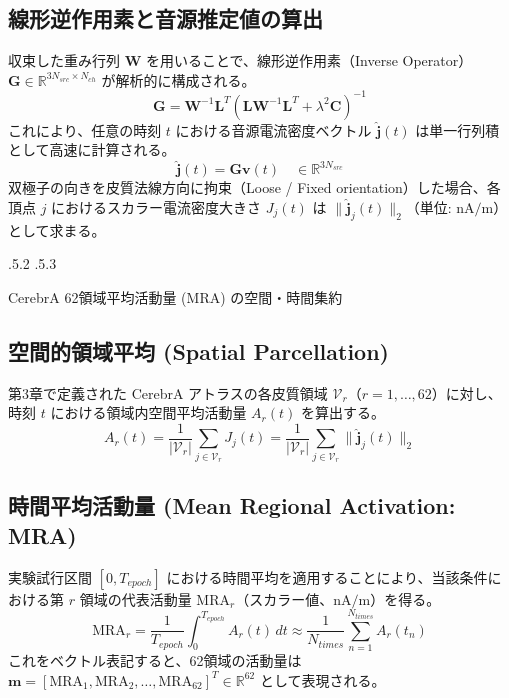 \documentclass[platex,dvipdfmx,12pt]{jsarticle}
\makeatletter
\renewcommand{\section}{%
  \clearpage
  \@startsection{section}{1}{\z@}%
  {\Cvs \@plus.5\Cdp \@minus.2\Cdp}%
  {.5\Cvs \@plus.3\Cdp}%
  {\normalfont\LARGE\headfont\raggedright}%
}
\makeatother
\begin{document}
\subsection{線形逆作用素と音源推定値の算出}
収束した重み行列 $\mathbf{W}$ を用いることで、線形逆作用素（Inverse Operator） $\mathbf{G} \in \mathbb{R}^{3 N_{src} \times N_{ch}}$ が解析的に構成される。
\begin{equation}
  \mathbf{G} = \mathbf{W}^{-1} \mathbf{L}^T \left( \mathbf{L} \mathbf{W}^{-1} \mathbf{L}^T + \lambda^2 \mathbf{C} \right)^{-1}
  \label{eq:inverse_operator}
\end{equation}
これにより、任意の時刻 $t$ における音源電流密度ベクトル $\hat{\mathbf{j}}(t)$ は単一行列積として高速に計算される。
\begin{equation}
  \hat{\mathbf{j}}(t) = \mathbf{G} \mathbf{v}(t) \quad \in \mathbb{R}^{3 N_{src}}
  \label{eq:source_reconstruction}
\end{equation}
双極子の向きを皮質法線方向に拘束（Loose / Fixed orientation）した場合、各頂点 $j$ におけるスカラー電流密度大きさ $J_j(t)$ は $\|\hat{\mathbf{j}}_j(t)\|_2$（単位: $\text{nA/m}$）として求まる。

\section{CerebrA 62領域平均活動量 (MRA) の空間・時間集約}

\subsection{空間的領域平均 (Spatial Parcellation)}
第3章で定義された CerebrA アトラスの各皮質領域 $\mathcal{V}_r$（$r=1, \dots, 62$）に対し、時刻 $t$ における領域内空間平均活動量 $A_r(t)$ を算出する。
\begin{equation}
  A_r(t) = \frac{1}{|\mathcal{V}_r|} \sum_{j \in \mathcal{V}_r} J_j(t) = \frac{1}{|\mathcal{V}_r|} \sum_{j \in \mathcal{V}_r} \|\hat{\mathbf{j}}_j(t)\|_2
  \label{eq:spatial_aggregation}
\end{equation}

\subsection{時間平均活動量 (Mean Regional Activation: MRA)}
実験試行区間 $[0, T_{epoch}]$ における時間平均を適用することにより、当該条件における第 $r$ 領域の代表活動量 $\text{MRA}_r$（スカラー値、$\text{nA/m}$）を得る。
\begin{equation}
  \text{MRA}_r = \frac{1}{T_{epoch}} \int_0^{T_{epoch}} A_r(t) \, dt \approx \frac{1}{N_{times}} \sum_{n=1}^{N_{times}} A_r(t_n)
  \label{eq:mra_definition}
\end{equation}
これをベクトル表記すると、62領域の活動量は $\mathbf{m} = [\text{MRA}_1, \text{MRA}_2, \dots, \text{MRA}_{62}]^T \in \mathbb{R}^{62}$ として表現される。
\end{document}
